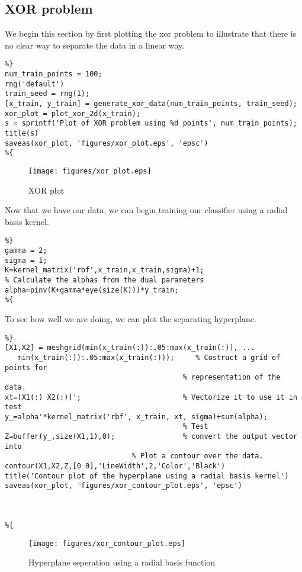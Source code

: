 \documentclass[11pt, twoside]{article}   	%
\begin{document}
\subsection{XOR problem}
We begin this section by first plotting the xor problem to illustrate that
there is no clear way to separate the data in a linear way. 
\begin{lstlisting}
%}
num_train_points = 100; 
rng('default') 
train_seed = rng(1); 
[x_train, y_train] = generate_xor_data(num_train_points, train_seed);
xor_plot = plot_xor_2d(x_train); 
s = sprintf('Plot of XOR problem using %d points', num_train_points);
title(s)
saveas(xor_plot, 'figures/xor_plot.eps', 'epsc')
%{
\end{lstlisting}

\begin{figure}[h]
\centering
\texttt{[image: figures/xor\_plot.eps]}
\caption{XOR plot}
\label{fig:xor_plot} 
\end{figure}

\FloatBarrier

Now that we have our data, we can begin training our classifier using a
radial basis kernel. 

\begin{lstlisting}
%}
gamma = 2; 
sigma = 1; 
K=kernel_matrix('rbf',x_train,x_train,sigma)+1; 
% Calculate the alphas from the dual parameters
alpha=pinv(K+gamma*eye(size(K)))*y_train;
%{
\end{lstlisting}

To see how well we are doing, we can plot the separating hyperplane. 
\begin{lstlisting}
%}
[X1,X2] = meshgrid(min(x_train(:)):.05:max(x_train(:)), ...
   min(x_train(:)):.05:max(x_train(:)));     % Costruct a grid of points for 
                                          % representation of the data.
xt=[X1(:) X2(:)]';                        % Vectorize it to use it in test 
y_=alpha'*kernel_matrix('rbf', x_train, xt, sigma)+sum(alpha);    
                                          % Test
Z=buffer(y_,size(X1,1),0);                % convert the output vector into
                              % Plot a contour over the data. 
contour(X1,X2,Z,[0 0],'LineWidth',2,'Color','Black')
title('Contour plot of the hyperplane using a radial basis kernel')
saveas(xor_plot, 'figures/xor_contour_plot.eps', 'epsc')



%{
\end{lstlisting}

\begin{figure}[h]
\centering
\texttt{[image: figures/xor\_contour\_plot.eps]}
\caption{Hyperplane seperation using a radial basis function}
\label{fig:xor_contour_plot} 
\end{figure}
\end{document}
